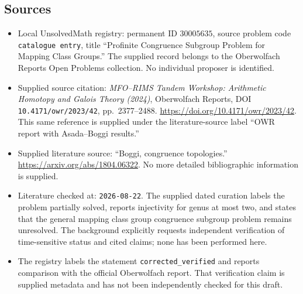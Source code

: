 \documentclass[11pt]{article}
\begin{document}
\subsection{Sources}
\begin{itemize}
\item Local UnsolvedMath registry: permanent ID \(30005635\), source problem code \texttt{catalogue entry}, title ``Profinite Congruence Subgroup Problem for Mapping Class Groups.'' The supplied record belongs to the Oberwolfach Reports Open Problems collection. No individual proposer is identified.
\item Supplied source citation: \emph{MFO--RIMS Tandem Workshop: Arithmetic Homotopy and Galois Theory (2024)}, Oberwolfach Reports, DOI \texttt{10.4171/owr/2023/42}, pp.\ 2377--2488. \url{https://doi.org/10.4171/owr/2023/42}. This same reference is supplied under the literature-source label ``OWR report with Asada--Boggi results.''
\item Supplied literature source: ``Boggi, congruence topologies.'' \url{https://arxiv.org/abs/1804.06322}. No more detailed bibliographic information is supplied.
\item Literature checked at: \texttt{2026-08-22}. The supplied dated curation labels the problem partially solved, reports injectivity for genus at most two, and states that the general mapping class group congruence subgroup problem remains unresolved. The background explicitly requests independent verification of time-sensitive status and cited claims; none has been performed here.
\item The registry labels the statement \texttt{corrected\_verified} and reports comparison with the official Oberwolfach report. That verification claim is supplied metadata and has not been independently checked for this draft.
\end{itemize}
\end{document}
